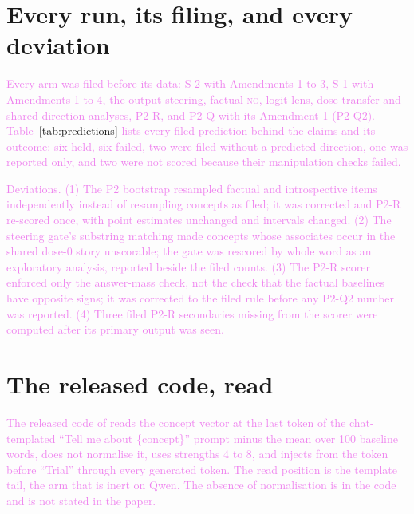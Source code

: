 \documentclass[11pt,a4paper]{article}
\newcommand{\no}{\textup{\textsc{no}}}
\newcommand{\draft}[1]{\textcolor{violet}{#1}}
\begin{document}



\appendix
\section{Every run, its filing, and every deviation}
\label{app:deviations}
\draft{Every arm was filed before its data: S-2 with Amendments 1 to 3, S-1 with Amendments 1 to 4,
the output-steering, factual-\no{}, logit-lens, dose-transfer and shared-direction analyses, P2-R,
and P2-Q with its Amendment 1 (P2-Q2). Table~\ref{tab:predictions} lists every filed prediction
behind the claims and its outcome: six held, six failed, two were filed without a predicted
direction, one was reported only, and two were not scored because their manipulation checks
failed.}

\draft{Deviations. (1) The P2 bootstrap resampled factual and introspective items independently
instead of resampling concepts as filed; it was corrected and P2-R re-scored once, with point
estimates unchanged and intervals changed. (2) The steering gate's substring matching made
concepts whose associates occur in the shared dose-0 story unscorable; the gate was rescored by
whole word as an exploratory analysis, reported beside the filed counts. (3) The P2-R scorer
enforced only the answer-mass check, not the check that the factual baselines have opposite
signs; it was corrected to the filed rule before any P2-Q2 number was reported. (4) Three filed
P2-R secondaries missing from the scorer were computed after its primary output was seen.}

\begin{table}[t]
\centering
\resizebox{\textwidth}{!}{}
\caption{\draft{Every filed prediction behind the paper's claims, with its filing date and
outcome. $^\dagger$Filed after the liveness labels were known.}}
\label{tab:predictions}
\end{table}

\section{The released code, read}
\draft{The released code of \citet{macar2026mechanisms} reads the concept vector at the last token
of the chat-templated ``Tell me about \{concept\}'' prompt minus the mean over 100 baseline words,
does not normalise it, uses strengths 4 to 8, and injects from the token before ``Trial'' through
every generated token. The read position is the template tail, the arm that is inert on Qwen. The
absence of normalisation is in the code and is not stated in the paper.}
\end{document}
